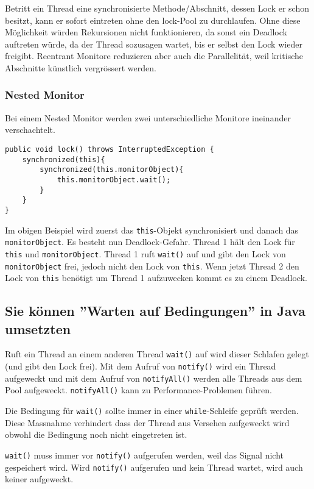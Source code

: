 Betritt ein Thread eine synchronisierte Methode/Abschnitt, dessen Lock er schon besitzt, kann er sofort eintreten ohne den lock-Pool zu durchlaufen. Ohne diese Möglichkeit würden Rekursionen nicht funktionieren, da sonst ein Deadlock auftreten würde, da der Thread sozusagen wartet, bis er selbst den Lock wieder freigibt. 
Reentrant Monitore reduzieren aber auch die Parallelität, weil kritische Abschnitte künstlich vergrössert werden.

\subsubsection{Nested Monitor}

Bei einem Nested Monitor werden zwei unterschiedliche Monitore ineinander verschachtelt.

\begin{lstlisting}[caption={Nested Monitor},label=lst:nested_monitor]
public void lock() throws InterruptedException {
	synchronized(this){
		synchronized(this.monitorObject){
			this.monitorObject.wait();
		}
	}
}	  
\end{lstlisting}

Im obigen Beispiel wird zuerst das \texttt{this}-Objekt synchronisiert und danach das \texttt{monitorObject}. Es besteht nun Deadlock-Gefahr. Thread 1 hält den Lock für \texttt{this} und \texttt{monitorObject}. Thread 1 ruft \texttt{wait()} auf und gibt den Lock von \texttt{monitorObject} frei, jedoch nicht den Lock von \texttt{this}. Wenn jetzt Thread 2 den Lock von \texttt{this} benötigt um Thread 1 aufzuwecken kommt es zu einem Deadlock.

\subsection{Sie können ''Warten auf Bedingungen'' in Java umsetzten}

Ruft ein Thread an einem anderen Thread \texttt{wait()} auf wird dieser Schlafen gelegt (und gibt den Lock frei). Mit dem Aufruf von \texttt{notify()} wird ein Thread aufgeweckt und mit dem Aufruf von \texttt{notifyAll()} werden alle Threads aus dem Pool aufgeweckt. \texttt{notifyAll()} kann zu Performance-Problemen führen. 

Die Bedingung für \texttt{wait()} sollte immer in einer \texttt{while}-Schleife geprüft werden. Diese Massnahme verhindert dass der Thread aus Versehen aufgeweckt wird obwohl die Bedingung noch nicht eingetreten ist. 

\texttt{wait()} muss immer vor \texttt{notify()} aufgerufen werden, weil das Signal nicht gespeichert wird. Wird \texttt{notify()} aufgerufen und kein Thread wartet, wird auch keiner aufgeweckt.

